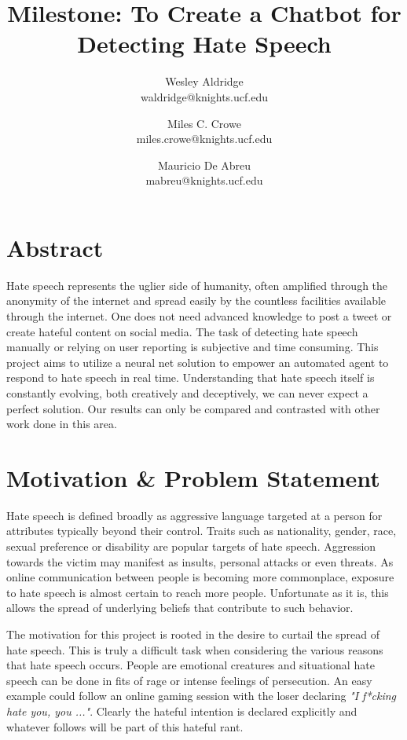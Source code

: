 \documentclass[conference]{sig-alternate-05-2015}
\begin{document}
\title{Milestone: To Create a Chatbot for Detecting Hate Speech}

\author{Wesley Aldridge\\ waldridge@knights.ucf.edu \and Miles C. Crowe  \\ miles.crowe@knights.ucf.edu \and Mauricio De Abreu\\ mabreu@knights.ucf.edu}

\maketitle

\section{Abstract}
Hate speech represents the uglier side of humanity, often amplified through the anonymity of the internet and spread easily by the countless facilities available through the internet.  One does not need advanced knowledge to post a tweet or create hateful content on social media.  The task of detecting hate speech manually or relying on user reporting is subjective and time consuming.  This project aims to utilize a neural net solution to empower an automated agent to respond to hate speech in real time.  Understanding that hate speech itself is constantly evolving, both creatively and deceptively, we can never expect a perfect solution.  Our results can only be compared and contrasted with other work done in this area.

\section{Motivation \& Problem Statement}\label{sec:motivation}
Hate speech is defined broadly as aggressive language targeted at a person for attributes typically beyond their control.  Traits such as nationality, gender, race, sexual preference or disability are popular targets of hate speech\cite{Dictionary.com}.  Aggression towards the victim may manifest as insults, personal attacks or even threats.  As online communication between people is becoming more commonplace, exposure to hate speech is almost certain to reach more people.  Unfortunate as it is, this allows the spread of underlying beliefs that contribute to such behavior.

The motivation for this project is rooted in the desire to curtail the spread of hate speech.  This is truly a difficult task when considering the various reasons that hate speech occurs.  People are emotional creatures and situational hate speech can be done in fits of rage or intense feelings of persecution.  An easy example could follow an online gaming session with the loser declaring \textit{"I f*cking hate you, you ..."}.  Clearly the hateful intention is declared explicitly and whatever follows will be part of this hateful rant.  
\end{document}
